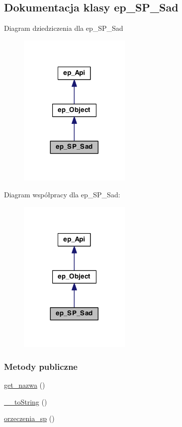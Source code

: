 \hypertarget{classep___s_p___sad}{\subsection{Dokumentacja klasy ep\-\_\-\-S\-P\-\_\-\-Sad}
\label{classep___s_p___sad}
}


Diagram dziedziczenia dla ep\-\_\-\-S\-P\-\_\-\-Sad\nopagebreak
\begin{figure}[H]
\begin{center}
\leavevmode
\includegraphics[width=152pt]{classep___s_p___sad__inherit__graph}
\end{center}
\end{figure}


Diagram współpracy dla ep\-\_\-\-S\-P\-\_\-\-Sad\-:\nopagebreak
\begin{figure}[H]
\begin{center}
\leavevmode
\includegraphics[width=152pt]{classep___s_p___sad__coll__graph}
\end{center}
\end{figure}
\subsubsection*{Metody publiczne}
\begin{DoxyCompactItemize}
\item 
\hyperlink{classep___s_p___sad_ac0818f0049d7b84f08f77128f54cee36}{get\-\_\-nazwa} ()
\item 
\hyperlink{classep___s_p___sad_a7516ca30af0db3cdbf9a7739b48ce91d}{\-\_\-\-\_\-to\-String} ()
\item 
\hyperlink{classep___s_p___sad_a0253193f97ea82c02858e0b933a74880}{orzeczenia\-\_\-sp} ()
\end{DoxyCompactItemize}
